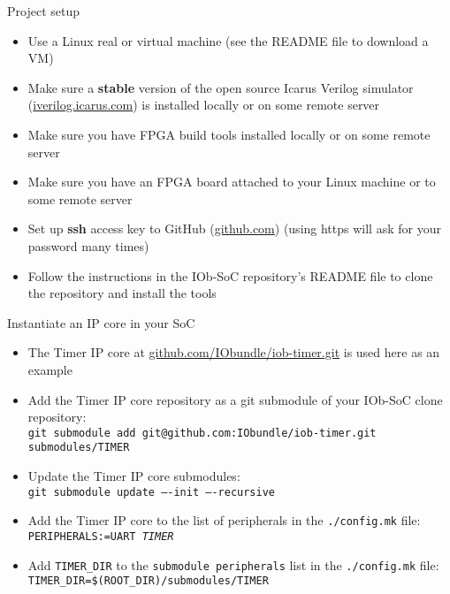 \documentclass [xcolor=svgnames, t] {beamer}
\begin{document}
\begin{frame}{Project setup}
\begin{center}
  \begin{itemize}
    \item Use a Linux real or virtual machine (see the README file to download a VM)
    \item Make sure a {\bf stable} version of the open source Icarus Verilog simulator (\url{iverilog.icarus.com}) is installed locally or on some remote server
    \item Make sure you have FPGA build tools installed locally or on some remote server
    \item Make sure you have an FPGA board attached to your Linux machine or to some remote server
    \item Set up {\bf ssh} access key to GitHub (\url{github.com}) (using https will ask for your password many times)
    \item Follow the instructions in the IOb-SoC repository's README file to clone the repository and install the tools
  \end{itemize}
\end{center}
\end{frame}


\begin{frame}{Instantiate an IP core in your SoC}
  \begin{itemize}
  \item The Timer IP core at \url{github.com/IObundle/iob-timer.git} is used here as an example
  \item Add the Timer IP core repository as a git submodule of your IOb-SoC clone repository:\\
    {\tt \tiny git submodule add git@github.com:IObundle/iob-timer.git submodules/TIMER}
  \item Update the Timer IP core submodules:\\
    {\tt \tiny git submodule update ----init ----recursive}
  \item Add the Timer IP core to the list of peripherals in the {\tt ./config.mk} file:\\
    {\tt PERIPHERALS:=UART {\em TIMER}}
  \item Add {\tt TIMER\_DIR} to the {\tt submodule peripherals} list in the {\tt ./config.mk} file:\\
    {\tt \tiny TIMER\_DIR=\$(ROOT\_DIR)/submodules/TIMER}
  \end{itemize}
\end{frame}
\end{document}
